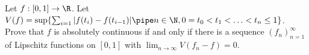 Let $f:[0,1]\rightarrow \R$. Let
$V(f)=\sup\{\sum_{i=1}|f(t_i)-f(t_{i-1})|\pipe n\in \N,
0=t_0<t_1<\ldots < t_n \leq 1 \}$. Prove that $f$ is absolutely
continuous if and only if there is a sequence $(f_n)_{n=1}^{\infty}$
of Lipschitz functions on $[0,1]$ with $\lim_{n\rightarrow
\infty}V(f_n-f)=0$.
